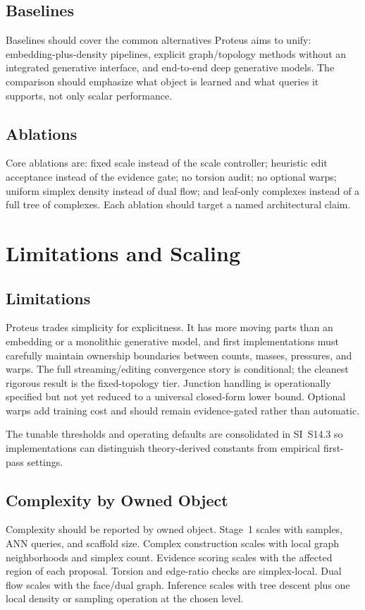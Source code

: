 \documentclass[11pt]{article}
\theoremstyle{definition}
\theoremstyle{plain}
\begin{document}
\subsection{Baselines}
Baselines should cover the common alternatives Proteus aims to unify: embedding-plus-density pipelines, explicit graph/topology methods without an integrated generative interface, and end-to-end deep generative models. The comparison should emphasize what object is learned and what queries it supports, not only scalar performance.

\subsection{Ablations}
Core ablations are: fixed scale instead of the scale controller; heuristic edit acceptance instead of the evidence gate; no torsion audit; no optional warps; uniform simplex density instead of dual flow; and leaf-only complexes instead of a full tree of complexes. Each ablation should target a named architectural claim.

\section{Limitations and Scaling}
\label{sec:limitations}

\subsection{Limitations}
Proteus trades simplicity for explicitness. It has more moving parts than an embedding or a monolithic generative model, and first implementations must carefully maintain ownership boundaries between counts, masses, pressures, and warps. The full streaming/editing convergence story is conditional; the cleanest rigorous result is the fixed-topology tier. Junction handling is operationally specified but not yet reduced to a universal closed-form lower bound. Optional warps add training cost and should remain evidence-gated rather than automatic.

The tunable thresholds and operating defaults are consolidated in SI~S14.3 so implementations can distinguish theory-derived constants from empirical first-pass settings.

\subsection{Complexity by Owned Object}
Complexity should be reported by owned object. Stage~1 scales with samples, ANN queries, and scaffold size. Complex construction scales with local graph neighborhoods and simplex count. Evidence scoring scales with the affected region of each proposal. Torsion and edge-ratio checks are simplex-local. Dual flow scales with the face/dual graph. Inference scales with tree descent plus one local density or sampling operation at the chosen level.
\end{document}
